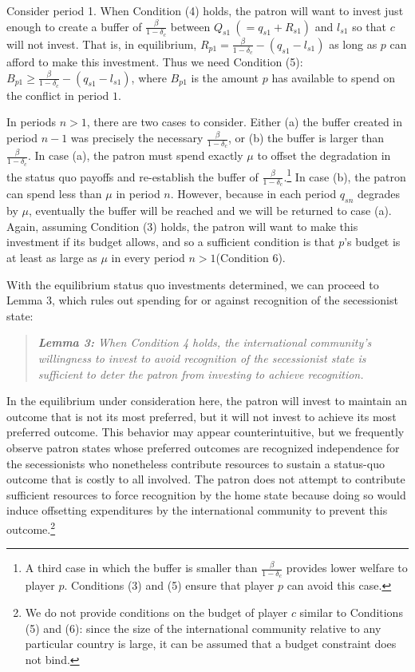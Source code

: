 \documentclass[12pt]{article}
\begin{document}
Consider period 1. When Condition (4) holds, the patron will want to invest just enough to create a buffer of $\frac{\beta}{1-\delta_c}$ between $Q_{s1} \ (= q_{s1} + R_{s1})$ and $l_{s1}$ so that $c$ will not invest. That is, in equilibrium, $R_{p1} = \frac{\beta}{1-\delta_c} -(q_{s1} - l_{s1})$ as long as $p$ can afford to make this investment. Thus we need Condition (5): $B_{p1} \geq\frac{\beta}{1-\delta_c} - \left(q_{s1} - l_{s1} \right)$, where $B_{p1}$ is the amount $p$ has available to spend on the conflict in period $1$.

In periods $n > 1$, there are two cases to consider. Either (a) the buffer created in period $n-1$ was precisely the necessary $\frac{\beta}{1-\delta_c}$, or (b) the buffer is larger than $\frac{\beta}{1-\delta_c}$. In case (a), the patron must spend exactly $\mu$ to offset the degradation in the status quo payoffs and re-establish the buffer of $\frac{\beta}{1-\delta_c}$.\footnote{A third case in which the buffer is smaller than $\frac{\beta}{1-\delta_c}$ provides lower welfare to player $p$. Conditions (3) and (5) ensure that player $p$ can avoid this case.} In case (b), the patron can spend less than $\mu$ in period $n$. However, because in each period $q_{sn}$ degrades by $\mu$, eventually the buffer will be reached and we will be returned to case (a). Again, assuming Condition (3) holds, the patron will want to make this investment if its budget allows, and so a sufficient condition is that $p$'s budget is at least as large as $\mu$ in every period $n > 1$(Condition 6). 

With the equilibrium status quo investments determined, we can proceed to Lemma 3, which rules out spending for or against recognition of the secessionist state:

\begin{quotation}
\noindent \textit{{\bf Lemma 3:} When Condition 4 holds, the international community's willingness to invest to avoid recognition of the secessionist state is sufficient to deter the patron from investing to achieve recognition.}
\end{quotation}

In the equilibrium under consideration here, the patron will invest to maintain an outcome that is not its most preferred, but it will not invest to achieve its most preferred outcome. This behavior may appear counterintuitive, but we frequently observe patron states whose preferred outcomes are recognized independence for the secessionists who  nonetheless contribute resources to sustain a status-quo outcome that is costly to all involved. The patron does not attempt to contribute sufficient resources to force recognition by the home state because doing so would induce offsetting expenditures by the international community to prevent this outcome.\footnote{We do not provide conditions on the budget of player $c$ similar to Conditions (5) and (6): since the size of the international community relative to any particular country is large, it can be assumed that a budget constraint does not bind.}
\end{document}
